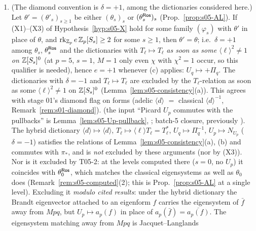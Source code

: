 \begin{proposition}[$\varepsilon=+1$; exponent $+1$]
\begin{enumerate}[label=(\alph*)]
  some character $\chi$ of $(\Z/N)^\times$ with $\chi(q)\ne\pm1$ occurs in the adelic diamond action on it), then $e=\delta$. If
  $\langle q\rangle^2=1$ there (e.g.\ $N\le2$, or $q^2\equiv\pm1\bmod N$: only even $\chi$ occur, since $\langle-1\rangle=1$ on the class set,
  see the proof), the relation imposes nothing. \stpmc{}; checked numerically in T05-2, Remark~\ref{rem:s05-computed}(2).
\item (The diamond convention is $\delta=+1$, among the dictionaries considered here.) Let $\theta'=(\theta'_s)_{s\ge1}$ be either $(\theta_s)_s$ or $(\theta^{\mathsf{Ros}}_s)_s$
  (Prop.~\ref{prop:s05-AL}). If (X1)--(X3) of Hypothesis~\ref{hyp:s05-X} hold for some family $(\varphi_s)$ with $\theta'$ in place of $\theta$,
  and $\operatorname{rk}_{\mathbb{Z}_p}e\,\mathbb{Z}_p[S_s]\ge2$ for some $s\ge1$, then $\theta'=\theta$; i.e.\ $\delta=+1$ among $\theta_s$, $\theta^{\mathsf{Ros}}_s$ and the dictionaries with $T_\ell\mapsto T_\ell$ \emph{as soon as some $\langle\ell\rangle^2\ne1$ on $\mathbb{Z}[S_s]^0$} (at $p=5$, $s=1$, $M=1$ only even $\chi$ with $\chi^2=1$ occur, so this qualifier is needed), hence $e=+1$ whenever (c) applies:
  $U_q\mapsto+\Pi_q$. The dictionaries with $\delta=-1$ and $T_\ell\mapsto T_\ell$ are excluded by the $T_\ell$-relation as soon as some
  $\langle\ell\rangle^2\ne1$ on $\mathbb{Z}[S_s]^0$ (Lemma~\ref{lem:s05-consistency}(a)). This agrees with stage 01's diamond flag on forms (adelic
  $\langle d\rangle$ $=$ classical $\langle d\rangle^{-1}$, Remark~\ref{rem:s01-diamond}). \stpmc{} (the input ``Picard $U_p$ commutes with the
  pullbacks'' is Lemma~\ref{lem:s05-Up-pullback}, \stpmc; batch-5 closure, previously \sttoprove). The hybrid dictionary $\langle d\rangle\mapsto\langle d\rangle$, $T_\ell\mapsto\langle\ell\rangle T_\ell=T_\ell^*$, $U_q\mapsto\Pi_q^{-1}$, $U_p\mapsto N_{U_p}$ ($\delta=-1$) satisfies the
  relations of Lemma~\ref{lem:s05-consistency}(a), (b) and commutes with $\pi_*$, and is \emph{not} excluded by these arguments (nor by (X3)). Nor is it excluded by T05-2: at the levels computed there ($s=0$, no $U_p$) it
  coincides with $\theta^{\mathsf{Ros}}_0$, which matches the classical eigensystems as well as $\theta_0$ does (Remark~\ref{rem:s05-computed}(2); this is
  Prop.~\ref{prop:s05-AL} at a single level). Excluding it \emph{modulo cited results}: under the hybrid dictionary the Brandt eigenvector attached to an eigenform $f$ carries the eigensystem of $\bar f$ away from $Mpq$, but $U_p\mapsto a_p(f)$ in place of $a_p(\bar f)=\overline{a_p(f)}$. The eigensystem matching away from $Mpq$ is Jacquet--Langlands

\end{enumerate}
\end{proposition}
